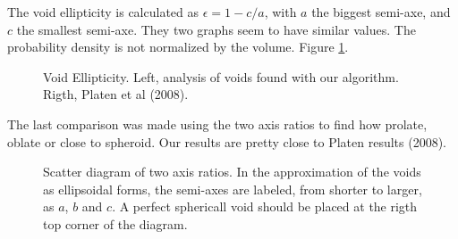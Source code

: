 \documentclass[preprint]{aastex62}
\begin{document}
The void ellipticity is calculated as $\epsilon = 1 - c/a$, with $a$ the biggest semi-axe, and
$c$ the smallest semi-axe. They two graphs seem to have similar values. The probability density
is not normalized by the volume. Figure \ref{fig:ellipticity}.

\begin{figure}
  \caption{Void Ellipticity. Left, analysis of voids found with our algorithm.
    Rigth, Platen et al (2008).
    \label{fig:ellipticity}}
\end{figure}

The last comparison was made using the two axis ratios to find how prolate, oblate or close
to spheroid. Our results are pretty close to Platen results (2008).

\begin{figure}
  \caption{Scatter diagram of two axis ratios. In the approximation of the voids
    as ellipsoidal forms, the semi-axes are labeled, from shorter to larger, as
    $a$, $b$ and $c$. A perfect sphericall void should be placed at the rigth top
    corner of the diagram. 
    \label{fig:two_axis_ratios}}
\end{figure}
\end{document}
